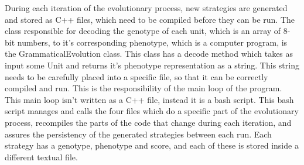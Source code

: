 During each iteration of the evolutionary process, new strategies are generated and stored as C++ files, which need to be compiled before they can be run. The class responsible for decoding the genotype of each unit, which is an array of 8-bit numbers, to it's corresponding phenotype, which is a computer program, is the GrammaticalEvolution class. This class has a decode method which takes as input some Unit and returns it's phenotype representation as a string. This string needs to be carefully placed into a specific file, so that it can be correctly compiled and run. This is the responsibility of the main loop of the program. This main loop isn't written as a C++ file, instead it is a bash script. This bash script manages and calls the four files which do a specific part of the evolutionary process, recompiles the parts of the code that change during each iteration, and assures the persistency of the generated strategies between each run. Each strategy has a genotype, phenotype and score, and each of these is stored inside a different textual file.